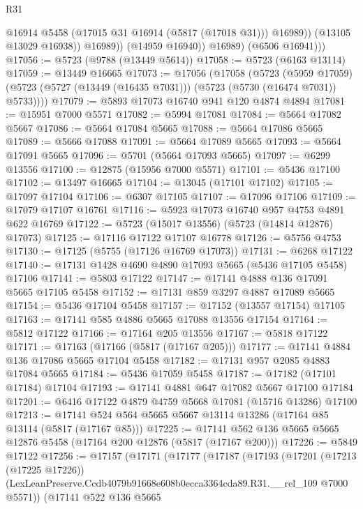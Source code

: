 \begin{lexlean}{R31}
\begin{coremodule}
                      @16914
                      @5458
                      (@17015 @31 @16914 (@5817 (@17018 @31)))
                      @16989))
                  (@13105 @13029 @16938))
                @16989))
            (@14959 @16940))
          @16989)
        (@6506 @16941)))
@17056 := @5723 (@9788 (@13449 @5614))
@17058 := @5723 (@6163 @13114)
@17059 := @13449 @16665
@17073 := @17056
    (@17058
      (@5723
        (@5959 @17059)
        (@5723 (@5727 (@13449 (@16435 @7031))) (@5723 (@5730 (@16474 @7031)) @5733))))
@17079 := @5893 @17073 @16740 @941 @120 @4874 @4894
@17081 := @15951 @7000 @5571
@17082 := @5994 @17081
@17084 := @5664 @17082 @5667
@17086 := @5664 @17084 @5665
@17088 := @5664 @17086 @5665
@17089 := @5666 @17088
@17091 := @5664 @17089 @5665
@17093 := @5664 @17091 @5665
@17096 := @5701 (@5664 @17093 @5665)
@17097 := @6299 @13556
@17100 := @12875 (@15956 @7000 @5571)
@17101 := @5436 @17100
@17102 := @13497 @16665
@17104 := @13045 (@17101 @17102)
@17105 := @17097 @17104
@17106 := @6307 @17105
@17107 := @17096 @17106
@17109 := @17079 @17107 @16761
@17116 := @5923 @17073 @16740 @957 @4753 @4891 @622 @16769
@17122 := @5723 (@15017 @13556) (@5723 (@14814 @12876) @17073)
@17125 := @17116 @17122 @17107 @16778
@17126 := @5756 @4753
@17130 := @17125 (@5755 (@17126 @16769 @17073))
@17131 := @6268 @17122
@17140 := @17131 @1428 @4690 @4890 @17093 @5665 (@5436 @17105 @5458) @17106
@17141 := @5803 @17122
@17147 := @17141 @4888 @136 @17091 @5665 @17105 @5458
@17152 := @17131 @859 @3297 @4887 @17089 @5665
@17154 := @5436 @17104 @5458
@17157 := @17152 (@13557 @17154) @17105
@17163 := @17141 @585 @4886 @5665 @17088 @13556 @17154
@17164 := @5812 @17122
@17166 := @17164 @205 @13556
@17167 := @5818 @17122
@17171 := @17163 (@17166 (@5817 (@17167 @205)))
@17177 := @17141 @4884 @136 @17086 @5665 @17104 @5458
@17182 := @17131 @957 @2085 @4883 @17084 @5665
@17184 := @5436 @17059 @5458
@17187 := @17182 (@17101 @17184) @17104
@17193 := @17141 @4881 @647 @17082 @5667 @17100 @17184
@17201 := @6416 @17122 @4879 @4759 @5668 @17081 (@15716 @13286) @17100
@17213 := @17141 @524 @564 @5665 @5667 @13114 @13286 (@17164 @85 @13114 (@5817 (@17167 @85)))
@17225 := @17141 @562 @136 @5665 @5665 @12876 @5458 (@17164 @200 @12876 (@5817 (@17167 @200)))
@17226 := @5849 @17122
@17256 := @17157
    (@17171
      (@17177
        (@17187
          (@17193
            (@17201
              (@17213 (@17225 @17226))
              (LexLeanPreserve.Ccdb4079b91668e608b0ecca3364cda89.R31.__rel_109 @7000 @5571))
            (@17141
              @522
              @136
              @5665

\end{coremodule}
\end{lexlean}
